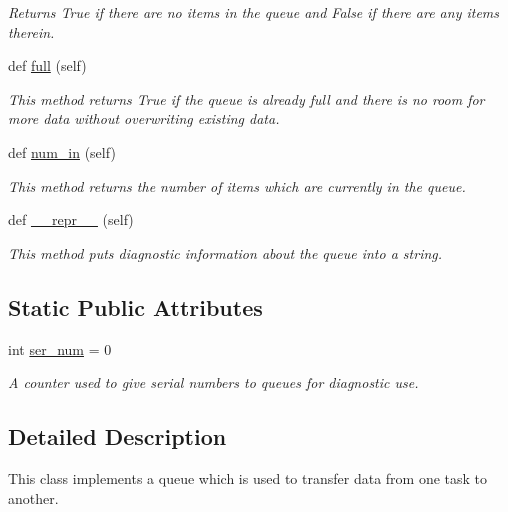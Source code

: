 \begin{DoxyCompactItemize}
\begin{DoxyCompactList}\small\item\em Returns {\ttfamily True} if there are no items in the queue and {\ttfamily False} if there are any items therein. \end{DoxyCompactList}\item 
def \hyperlink{classtask__share_1_1Queue_a0482d70ce6405fd8d85628b5cf95d471}{full} (self)
\begin{DoxyCompactList}\small\item\em This method returns {\ttfamily True} if the queue is already full and there is no room for more data without overwriting existing data. \end{DoxyCompactList}\item 
def \hyperlink{classtask__share_1_1Queue_a713321bacac5d93ecf89c4be1c15fe30}{num\+\_\+in} (self)
\begin{DoxyCompactList}\small\item\em This method returns the number of items which are currently in the queue. \end{DoxyCompactList}\item 
def \hyperlink{classtask__share_1_1Queue_a94d0801557844c8f7dcb772ca768a1a4}{\+\_\+\+\_\+repr\+\_\+\+\_\+} (self)
\begin{DoxyCompactList}\small\item\em This method puts diagnostic information about the queue into a string. \end{DoxyCompactList}\end{DoxyCompactItemize}
\subsection*{Static Public Attributes}
\begin{DoxyCompactItemize}
\item 
int \hyperlink{classtask__share_1_1Queue_a6f9d87b116eb16dba0867d3746af9f5f}{ser\+\_\+num} = 0
\begin{DoxyCompactList}\small\item\em A counter used to give serial numbers to queues for diagnostic use. \end{DoxyCompactList}\end{DoxyCompactItemize}


\subsection{Detailed Description}
This class implements a queue which is used to transfer data from one task to another. 

